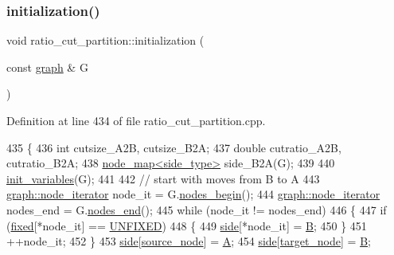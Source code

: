 \subsubsection{\texorpdfstring{initialization()}{initialization()}}
{\footnotesize\ttfamily void ratio\+\_\+cut\+\_\+partition\+::initialization (\begin{DoxyParamCaption}\item[{const \mbox{\hyperlink{classgraph}{graph}} \&}]{G }\end{DoxyParamCaption})\hspace{0.3cm}{\ttfamily [protected]}}



Definition at line 434 of file ratio\+\_\+cut\+\_\+partition.\+cpp.


\begin{DoxyCode}
435 \{
436     \textcolor{keywordtype}{int} cutsize\_A2B, cutsize\_B2A;
437     \textcolor{keywordtype}{double} cutratio\_A2B, cutratio\_B2A;
438     \mbox{\hyperlink{classnode__map}{node\_map<side\_type>}} side\_B2A(G);
439 
440     \mbox{\hyperlink{classratio__cut__partition_ab3054dcfbcd012aba57218fa6d0c471b}{init\_variables}}(G);
441 
442     \textcolor{comment}{// start with moves from B to A}
443     \mbox{\hyperlink{classgraph_a2cb374b84c133ce13f94e73c3e5da7fa}{graph::node\_iterator}} node\_it = G.\mbox{\hyperlink{classgraph_aec053a4b509d1be804237a80044c54c0}{nodes\_begin}}();
444     \mbox{\hyperlink{classgraph_a2cb374b84c133ce13f94e73c3e5da7fa}{graph::node\_iterator}} nodes\_end = G.\mbox{\hyperlink{classgraph_abbf9c0cb5629e98e1142254911238173}{nodes\_end}}();
445     \textcolor{keywordflow}{while} (node\_it != nodes\_end)
446     \{
447     \textcolor{keywordflow}{if} (\mbox{\hyperlink{classratio__cut__partition_ad77023b9f60e88274bf54f2019404768}{fixed}}[*node\_it] == \mbox{\hyperlink{classratio__cut__partition_a153cc7e51ac5d72a00671b6bdbcc6fa5}{UNFIXED}})
448     \{
449         \mbox{\hyperlink{classratio__cut__partition_a2bf913d1d8607747885177a3b585e611}{side}}[*node\_it] = \mbox{\hyperlink{classratio__cut__partition_adf075987228d8adc7950d5b1ba332daa}{B}};
450     \}
451     ++node\_it;
452     \}
453     \mbox{\hyperlink{classratio__cut__partition_a2bf913d1d8607747885177a3b585e611}{side}}[\mbox{\hyperlink{classratio__cut__partition_abb18c3acafc590e258453d7a8d86bb49}{source\_node}}] = \mbox{\hyperlink{classratio__cut__partition_a9c0da5ad845b01bddbc1f238fa35cdd0}{A}};
454     \mbox{\hyperlink{classratio__cut__partition_a2bf913d1d8607747885177a3b585e611}{side}}[\mbox{\hyperlink{classratio__cut__partition_a343ba76869e64141fb795010e388744b}{target\_node}}] = \mbox{\hyperlink{classratio__cut__partition_adf075987228d8adc7950d5b1ba332daa}{B}};

\end{DoxyCode}
